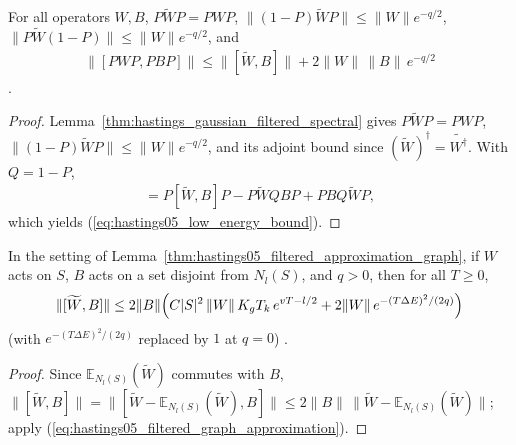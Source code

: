 \begin{lemma}
    \label{thm:hastings05_low_energy_commutator}
    \leanok
    For all operators $W,B$, $P\widetilde WP=PWP$,
    $\|(1-P)\widetilde WP\|\le\|W\|e^{-q/2}$,
    $\|P\widetilde W(1-P)\|\le\|W\|e^{-q/2}$, and
    \begin{align}
        \|[PWP,PBP]\|\le\|[\widetilde W,B]\|+2\|W\|\,\|B\|\,e^{-q/2}
        \label{eq:hastings05_low_energy_bound}
    \end{align}
    \cite[lines 1562--1593]{Hastings2006Solving}.
\end{lemma}
\begin{proof}\leanok
    Lemma~\ref{thm:hastings_gaussian_filtered_spectral} gives
    $P\widetilde WP=PWP$, $\|(1-P)\widetilde WP\|\le\|W\|e^{-q/2}$, and its
    adjoint bound since $(\widetilde W)^\dagger=\widetilde{W^\dagger}$. With
    $Q=1-P$,
    \begin{align}
        [P\widetilde WP,PBP]=P[\widetilde W,B]P-P\widetilde WQBP
        +PBQ\widetilde WP,
        \label{eq:hastings05_compressed_commutator_split}
    \end{align}
    which yields (\ref{eq:hastings05_low_energy_bound}).
\end{proof}

\begin{lemma}
    \label{thm:hastings05_lc}
    \leanok
    In the setting of Lemma~\ref{thm:hastings05_filtered_approximation_graph},
    if $W$ acts on $S$, $B$ acts on a set disjoint from $N_l(S)$, and $q>0$,
    then for all $T\ge0$,
    \begin{align}
        \|[\widetilde W,B]\|\le2\|B\|\Bigl(C|S|^2\,\|W\|\,K_gT_k\,e^{vT-l/2}
        +2\|W\|\,e^{-(T\Delta E)^2/(2q)}\Bigr)
        \label{eq:hastings05_separated_commutator}
    \end{align}
    (with $e^{-(T\Delta E)^2/(2q)}$ replaced by $1$ at $q=0$)
    \cite[lines 1548--1561]{Hastings2006Solving}.
\end{lemma}
\begin{proof}\leanok
    Since $\mathbb E_{N_l(S)}(\widetilde W)$ commutes with $B$,
    $\|[\widetilde W,B]\|=\|[\widetilde W-\mathbb E_{N_l(S)}(\widetilde W),B]\|
        \le2\|B\|\,\|\widetilde W-\mathbb E_{N_l(S)}(\widetilde W)\|$; apply
    (\ref{eq:hastings05_filtered_graph_approximation}).
\end{proof}

